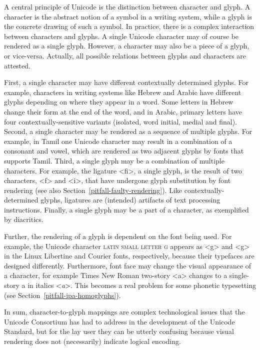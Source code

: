 A central principle of Unicode is the distinction between character and glyph. A
character is the abstract notion of a symbol in a writing system, while a glyph
is the concrete drawing of such a symbol. In practice, there is a complex
interaction between characters and glyphs. A single Unicode character may of
course be rendered as a single glyph. However, a character may also be a piece
of a glyph, or vice-versa. Actually, all possible relations between glyphs and
characters are attested.

First, a single character may have different contextually determined glyphs. For
example, characters in writing systems like Hebrew and Arabic have different
glyphs depending on where they appear in a word. Some letters in Hebrew change
their form at the end of the word, and in Arabic, primary letters have four
contextually-sensitive variants (isolated, word initial, medial and final).
Second, a single character may be rendered as a sequence of multiple glyphs. For
example, in Tamil one Unicode character may result in a combination of a
consonant and vowel, which are rendered as two adjacent glyphs by fonts that
supports Tamil. Third, a single glyph may be a combination of multiple
characters. For example, the ligature <ﬁ>, a single glyph, is the result of two
characters, <f> and <i>, that have undergone glyph substitution by font
rendering (see also Section~\ref{pitfall-faulty-rendering}). Like
contextually-determined glyphs, ligatures are (intended) artifacts of text
processing instructions. Finally, a single glyph may be a part of a
character, as exemplified by diacritics.

Further, the rendering of a glyph is dependent on the font being used. For
example, the Unicode character \textsc{latin small letter g} appears as <g> and
<{g}> in the Linux Libertine and Courier fonts, respectively,
because their typefaces are designed differently. Furthermore, font face may
change the visual appearance of a character, for example Times New Roman
two-story <{a}> changes to a single-story a in italics
<\emph{a}>. This becomes a real problem for some
phonetic typesetting (see Section~\ref{pitfall-ipa-homoglyphs}).

In sum, character-to-glyph mappings are complex technological issues that the
Unicode Consortium has had to address in the development of the Unicode
Standard, but for the lay user they can be utterly confusing because visual
rendering does not (necessarily) indicate logical encoding.

